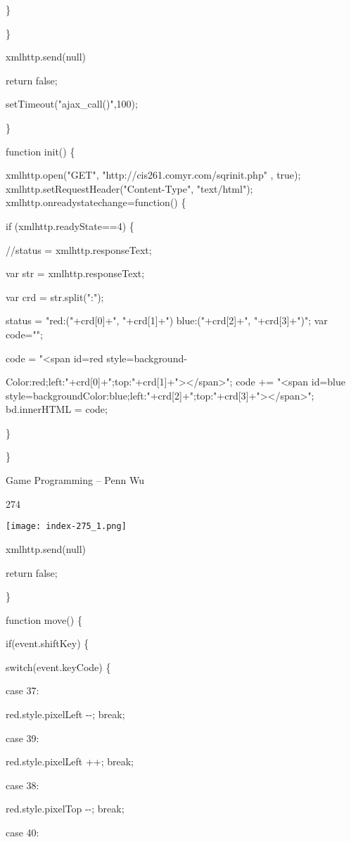 \documentclass[
]{article}
\begin{document}
\}

\}

xmlhttp.send(null)

return false;

setTimeout("ajax\_call()",100);

\}

function init() \{

xmlhttp.open("GET", "http://cis261.comyr.com/sqrinit.php" , true);
xmlhttp.setRequestHeader("Content-Type", "text/html");
xmlhttp.onreadystatechange=function() \{

if (xmlhttp.readyState==4) \{

//status = xmlhttp.responseText;

var str = xmlhttp.responseText;

var crd = str.split(":");

status = "red:("+crd{[}0{]}+", "+crd{[}1{]}+") blue:("+crd{[}2{]}+",
"+crd{[}3{]}+")"; var code="";

code = "\textless span id=\textquotesingle red\textquotesingle{}
style=\textquotesingle background-

Color:red;left:"+crd{[}0{]}+";top:"+crd{[}1{]}+"\textquotesingle\textgreater\textless/span\textgreater";
code += "\textless span id=\textquotesingle blue\textquotesingle{}
style=\textquotesingle backgroundColor:blue;left:"+crd{[}2{]}+";top:"+crd{[}3{]}+"\textquotesingle\textgreater\textless/span\textgreater";
bd.innerHTML = code;

\}

\}

Game Programming -- Penn Wu

274

\protect\hypertarget{index_split_014.htmlux5cux23p275}{}{}\texttt{[image: index-275\_1.png]}

xmlhttp.send(null)

return false;

\}

function move() \{

if(event.shiftKey) \{

switch(event.keyCode) \{

case 37:

red.style.pixelLeft -\/-; break;

case 39:

red.style.pixelLeft ++; break;

case 38:

red.style.pixelTop -\/-; break;

case 40:
\end{document}
